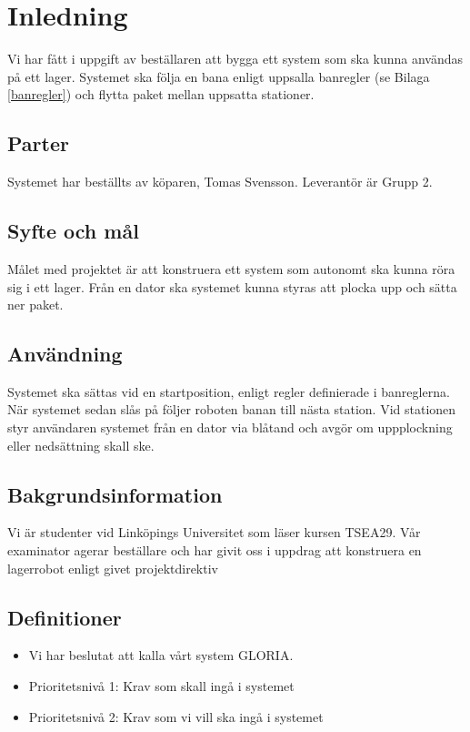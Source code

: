 \section{Inledning}
Vi har fått i uppgift av beställaren att bygga ett system som ska kunna användas på ett lager. Systemet ska följa en bana enligt uppsalla banregler (se Bilaga \ref{banregler}) och flytta paket mellan uppsatta stationer.

\begin{LIPSkravlista}
\end{LIPSkravlista}

\subsection{Parter}
Systemet har beställts av köparen, Tomas Svensson. Leverantör är Grupp 2.

\subsection{Syfte och mål}
Målet med projektet är att konstruera ett system som autonomt ska kunna röra sig i ett lager. Från en dator ska systemet kunna styras att plocka upp och sätta ner paket.

\subsection{Användning}
Systemet ska sättas vid en startposition, enligt regler definierade i banreglerna. När systemet sedan slås på följer roboten banan till nästa station. Vid stationen styr användaren systemet från en dator via blåtand och avgör om uppplockning eller nedsättning skall ske.

\subsection{Bakgrundsinformation}
Vi är studenter vid Linköpings Universitet som läser kursen TSEA29. Vår examinator agerar beställare och har givit oss i uppdrag att konstruera en lagerrobot enligt givet projektdirektiv

\subsection{Definitioner}

\begin{itemize}
\item{Vi har beslutat att kalla vårt system GLORIA.}
\item{Prioritetsnivå 1: Krav som skall ingå i systemet}
\item{Prioritetsnivå 2: Krav som vi vill ska ingå i systemet}
\end{itemize}
